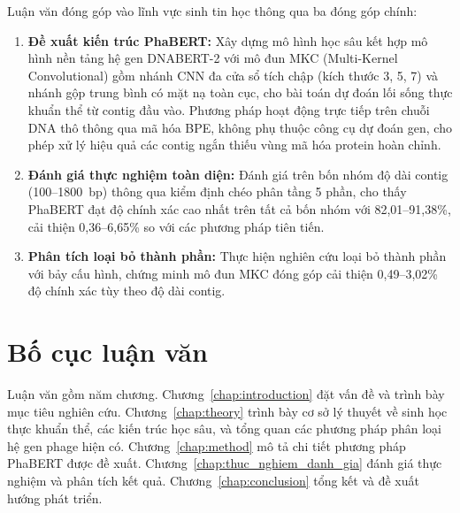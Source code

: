 Luận văn đóng góp vào lĩnh vực sinh tin học thông qua ba đóng góp chính:

\begin{enumerate}
    \item \textbf{Đề xuất kiến trúc PhaBERT:} Xây dựng mô hình học sâu kết hợp mô hình nền tảng hệ gen DNABERT-2 với mô đun MKC (Multi-Kernel Convolutional) gồm nhánh CNN đa cửa sổ tích chập (kích thước 3, 5, 7) và nhánh gộp trung bình có mặt nạ toàn cục, cho bài toán dự đoán lối sống thực khuẩn thể từ contig đầu vào. Phương pháp hoạt động trực tiếp trên chuỗi DNA thô thông qua mã hóa BPE, không phụ thuộc công cụ dự đoán gen, cho phép xử lý hiệu quả các contig ngắn thiếu vùng mã hóa protein hoàn chỉnh.
    \item \textbf{Đánh giá thực nghiệm toàn diện:} Đánh giá trên bốn nhóm độ dài contig (100--1800~bp) thông qua kiểm định chéo phân tầng 5 phần, cho thấy PhaBERT đạt độ chính xác cao nhất trên tất cả bốn nhóm với 82,01--91,38\%, cải thiện 0,36--6,65\% so với các phương pháp tiên tiến.
    \item \textbf{Phân tích loại bỏ thành phần:} Thực hiện nghiên cứu loại bỏ thành phần với bảy cấu hình, chứng minh mô đun MKC đóng góp cải thiện 0,49--3,02\% độ chính xác tùy theo độ dài contig.
\end{enumerate}

\section{Bố cục luận văn}
\label{sec:organization}

Luận văn gồm năm chương. Chương~\ref{chap:introduction} đặt vấn đề và trình bày mục tiêu nghiên cứu. Chương~\ref{chap:theory} trình bày cơ sở lý thuyết về sinh học thực khuẩn thể, các kiến trúc học sâu, và tổng quan các phương pháp phân loại hệ gen phage hiện có. Chương~\ref{chap:method} mô tả chi tiết phương pháp PhaBERT được đề xuất. Chương~\ref{chap:thuc_nghiem_danh_gia} đánh giá thực nghiệm và phân tích kết quả. Chương~\ref{chap:conclusion} tổng kết và đề xuất hướng phát triển.

